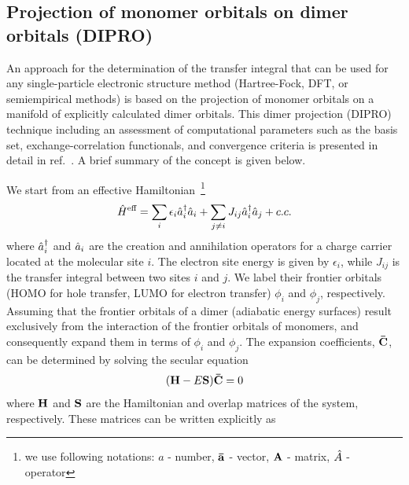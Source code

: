 \subsection{Projection of monomer orbitals on dimer orbitals (DIPRO)}
\label{sec:dipro}
An approach for the determination of the transfer integral that can be used for any single-particle electronic structure method (Hartree-Fock, DFT, or semiempirical methods) is based on the projection of monomer orbitals on a manifold of explicitly calculated dimer orbitals. This dimer projection (DIPRO) technique including an assessment of computational parameters such as the basis set, exchange-correlation functionals, and convergence criteria is presented in detail in ref.~\cite{baumeier_density-functional_2010}. A brief summary of the concept is given below.

We start from an effective Hamiltonian~\footnote{we use following notations: $a$ - number, $\mathbf{ \bar{a} }$ - vector, $\mathbf{ A }$ - matrix, $\hat{ A }$ - operator}
%
\begin{equation}
  \hat{ H }^\text{eff} = \sum_i \epsilon_i \hat{ a }_i^\dagger \hat{ a }_i + \sum_{j \neq i} J_{ij} \hat{ a }_i^\dagger \hat{ a }_j + c.c.
  \label{equ:dipro_eq1}
\end{equation}
%
where $\hat{ a }_i^\dagger$ and $\hat{ a }_i$ are the creation and annihilation operators for a charge carrier located at the molecular site $i$.
The electron site energy is given by $\epsilon_i$, while $J_{ij}$  is the transfer integral between two sites $i$ and $j$. We label their frontier orbitals (HOMO for hole transfer, LUMO for electron transfer) $\phi_i$ and $\phi_j$, respectively. Assuming that the frontier orbitals of a dimer (adiabatic energy surfaces) result exclusively from the interaction of the frontier orbitals of monomers, and consequently expand them in terms of $\phi_i$ and $\phi_j$. The expansion coefficients, $\mathbf{ \bar{C} }$, can be determined by solving the secular equation
%
\begin{equation}
  (\mathbf{ H } - E \mathbf{ S })\mathbf{ \bar{C} } = 0
  \label{equ:dipro_eq2}
\end{equation}
%
where $\mathbf{ H }$ and $\mathbf{ S }$ are the Hamiltonian and overlap matrices of the system, respectively. 
%
%
%
These matrices can be written explicitly as
